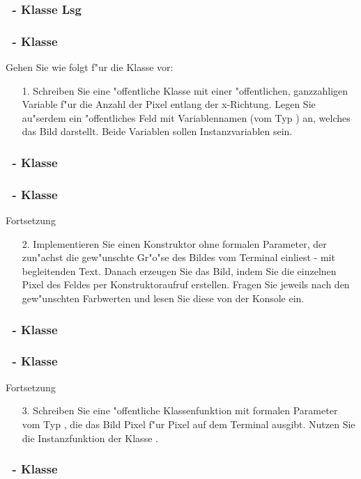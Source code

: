 \begin{frame}%
  \frametitle{\theexercise\ - Klasse  Lsg }%

\end{frame}

\begin{frame}%
  \frametitle{\theexercise\ - Klasse }%

Gehen Sie wie folgt f"ur die Klasse  vor:
\begin{enumerate}
\item[1.] Schreiben Sie eine "offentliche Klasse  mit einer "offentlichen, ganzzahligen Variable  f"ur die Anzahl der Pixel entlang der x-Richtung.
  Legen Sie au"serdem ein "offentliches Feld mit Variablennamen  (vom Typ ) an, welches das Bild darstellt.
  Beide Variablen sollen Instanzvariablen sein.
\end{enumerate}
\pause
  \frametitle{\theexercise\ - Klasse  }%

\end{frame}



\begin{frame}%
  \frametitle{\theexercise\ - Klasse }%

Fortsetzung
\begin{enumerate}
\item[2.] Implementieren Sie einen Konstruktor ohne formalen Parameter, der zun"achst die gew"unschte Gr"o"se des Bildes vom Terminal einliest - mit begleitenden Text.
  Danach erzeugen Sie das Bild, indem Sie die einzelnen Pixel des Feldes  per Konstruktoraufruf erstellen.
  \mbox{Fragen} Sie jeweils nach den gew"unschten Farbwerten und lesen Sie diese von der Konsole ein.
\end{enumerate}
\pause
  \frametitle{\theexercise\ - Klasse  }%

\end{frame}

\begin{frame}%
  \frametitle{\theexercise\ - Klasse }%

Fortsetzung
\begin{enumerate}
\item[3.] Schreiben Sie eine "offentliche Klassenfunktion  mit formalen Parameter vom Typ , die das Bild Pixel f"ur Pixel auf dem Terminal ausgibt.
  Nutzen Sie die Instanzfunktion  der Klasse .
\end{enumerate}
\pause
  \frametitle{\theexercise\ - Klasse  }%

\end{frame}


